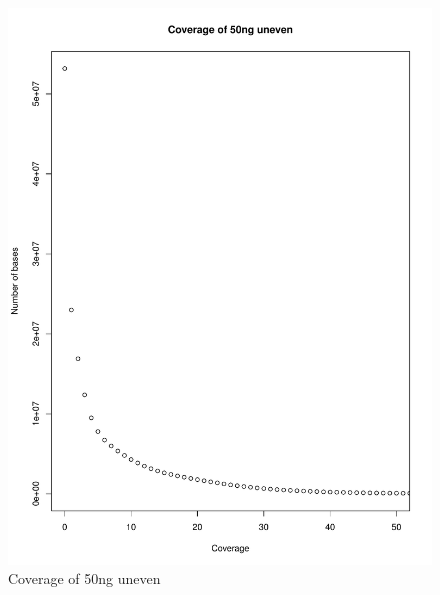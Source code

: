 \documentclass[a4paper,12pt]{article}
\begin{document}
\begin{figure}[ht!]
  \centering
    \includegraphics[width=\textwidth]{figures/coverageperbase-50ng_unbalanced.pdf}
  \caption{Coverage of 50ng uneven}
  \label{fig:coverage50nguneven}
\end{figure}
\end{document}
